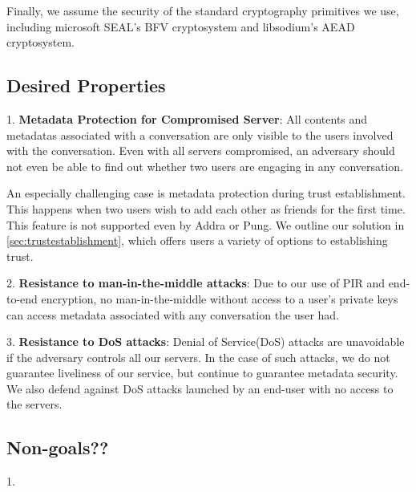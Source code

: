 
Finally, we assume the security of the standard cryptography primitives we use, including microsoft SEAL's BFV cryptosystem and libsodium's AEAD cryptosystem. 

\subsection{Desired Properties}

1. \textbf{Metadata Protection for Compromised Server}: All contents and metadatas associated with a conversation are only visible to the users involved with the conversation. Even with all servers compromised, an adversary should not even be able to find out whether two users are engaging in any conversation.

An especially challenging case is metadata protection during trust establishment. This happens when two users wish to add each other as friends for the first time. This feature is not supported even by Addra or Pung. We outline our solution in \cref{sec:trustestablishment}, which offers users a variety of options to establishing trust.

2. \textbf{Resistance to man-in-the-middle attacks}: Due to our use of PIR and end-to-end encryption, no man-in-the-middle without access to a user's private keys can access metadata associated with any conversation the user had.

3. \textbf{Resistance to DoS attacks}: Denial of Service(DoS) attacks are unavoidable if the adversary controls all our servers. In the case of such attacks, we do not guarantee liveliness of our service, but continue to guarantee metadata security. We also defend against DoS attacks launched by an end-user with no access to the servers.

\subsection{Non-goals??}
1. 


